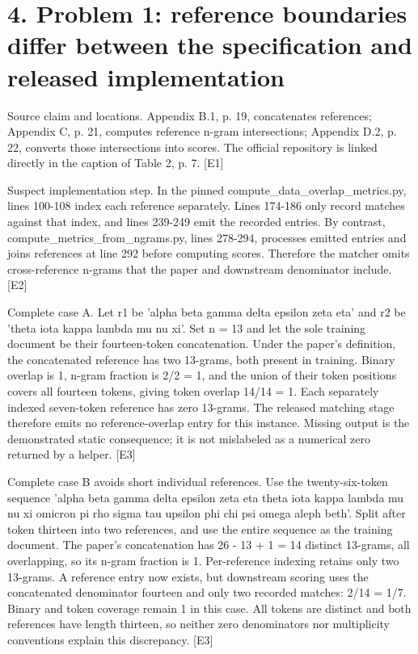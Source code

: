 \documentclass[10pt]{article}
\begin{document}
\section*{4. Problem 1: reference boundaries differ between the specification and released implementation}
Source claim and locations. Appendix B.1, p. 19, concatenates references; Appendix C, p. 21, computes reference n-gram intersections; Appendix D.2, p. 22, converts those intersections into scores. The official repository is linked directly in the caption of Table 2, p. 7. [E1]\par
Suspect implementation step. In the pinned compute\_data\_overlap\_metrics.py, lines 100-108 index each reference separately. Lines 174-186 only record matches against that index, and lines 239-249 emit the recorded entries. By contrast, compute\_metrics\_from\_ngrams.py, lines 278-294, processes emitted entries and joins references at line 292 before computing scores. Therefore the matcher omits cross-reference n-grams that the paper and downstream denominator include. [E2]\par
Complete case A. Let r1 be ’alpha beta gamma delta epsilon zeta eta’ and r2 be ’theta iota kappa lambda mu nu xi’. Set n = 13 and let the sole training document be their fourteen-token concatenation. Under the paper’s definition, the concatenated reference has two 13-grams, both present in training. Binary overlap is 1, n-gram fraction is 2/2 = 1, and the union of their token positions covers all fourteen tokens, giving token overlap 14/14 = 1. Each separately indexed seven-token reference has zero 13-grams. The released matching stage therefore emits no reference-overlap entry for this instance. Missing output is the demonstrated static consequence; it is not mislabeled as a numerical zero returned by a helper. [E3]\par
Complete case B avoids short individual references. Use the twenty-six-token sequence ’alpha beta gamma delta epsilon zeta eta theta iota kappa lambda mu nu xi omicron pi rho sigma tau upsilon phi chi psi omega aleph beth’. Split after token thirteen into two references, and use the entire sequence as the training document. The paper’s concatenation has 26 - 13 + 1 = 14 distinct 13-grams, all overlapping, so its n-gram fraction is 1. Per-reference indexing retains only two 13-grams. A reference entry now exists, but downstream scoring uses the concatenated denominator fourteen and only two recorded matches: 2/14 = 1/7. Binary and token coverage remain 1 in this case. All tokens are distinct and both references have length thirteen, so neither zero denominators nor multiplicity conventions explain this discrepancy. [E3]\par
\end{document}
